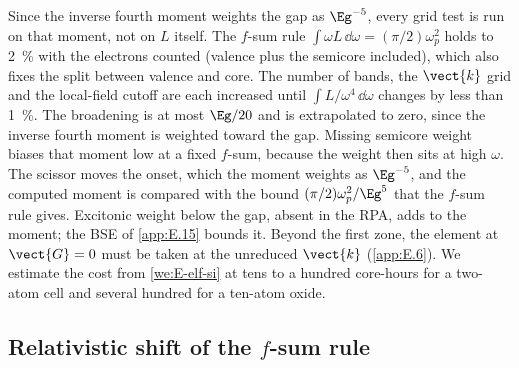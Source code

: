 Since the inverse fourth moment weights the gap as $\Eg^{-5}$, every grid test is run on that moment, not on $L$ itself. The $f$-sum rule $\int\omega L\,\dd\omega = (\pi/2)\omega_p^2$ holds to \SI{2}{\percent} with the electrons counted (valence plus the semicore included), which also fixes the split between valence and core. The number of bands, the $\vect{k}$ grid and the local-field cutoff are each increased until $\int L/\omega^4\,\dd\omega$ changes by less than \SI{1}{\percent}. The broadening is at most $\Eg/20$ and is extrapolated to zero, since the inverse fourth moment is weighted toward the gap. Missing semicore weight biases that moment low at a fixed $f$-sum, because the weight then sits at high $\omega$. The scissor moves the onset, which the moment weights as $\Eg^{-5}$, and the computed moment is compared with the bound $(\pi/2)\omega_p^2/\Eg^5$ that the $f$-sum rule gives. Excitonic weight below the gap, absent in the RPA, adds to the moment; the BSE of \cref{app:E.15} bounds it. Beyond the first zone, the element at $\vect{G} = 0$ must be taken at the unreduced $\vect{k}$ (\cref{app:E.6}). We estimate the cost from \cref{we:E-elf-si} at tens to a hundred core-hours for a two-atom cell and several hundred for a ten-atom oxide.

\subsection{Relativistic shift of the \texorpdfstring{$f$}{f}-sum rule}

